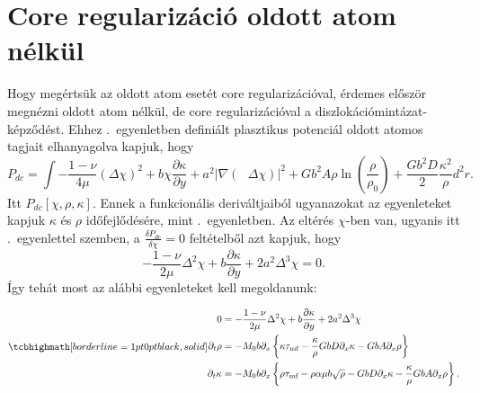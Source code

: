 \documentclass[10pt,a4paper]{scrartcl}
\begin{document}
\section{Core regularizáció oldott atom nélkül}
Hogy megértsük az oldott atom esetét core regularizációval, érdemes először megnézni oldott atom nélkül, de core regularizációval a diszlokációmintázat-képződést. Ehhez .\ egyenletben definiált plasztikus potenciál oldott atomos tagjait elhanyagolva kapjuk, hogy 
\begin{equation} \label{eq:plastic_pot_dc}
{P_{dc}} = \int { - \frac{{1 - \nu }}{{4\mu }}{{\left( {\Delta \chi } \right)}^2} + b\chi \frac{{\partial \kappa }}{{\partial y}} + {a^2}{{\left| {\nabla \left( {{\text{ }}\Delta \chi } \right)} \right|}^2} + G{b^2}A\rho \ln \left( {\frac{\rho }{{{\rho _0}}}} \right) + \frac{{G{b^2}D}}{2}\frac{{{\kappa ^2}}}{\rho }{d^2}r}.
\end{equation}
Itt ${P_{dc}}\left[ {\chi ,\rho ,\kappa } \right]$. Ennek a funkcionális deriváltjaiból ugyanazokat az egyenleteket kapjuk $\kappa$ és $\rho$ időfejlődésére, mint .\ egyenletben. Az eltérés $\chi$-ben van, ugyanis itt .\ egyenlettel szemben, a $\frac{{\delta {P_{dc}}}}{{\delta \chi }} = 0$ feltételből azt kapjuk, hogy 
\[ - \frac{{1 - \nu }}{{2\mu }}{\Delta ^2}\chi  + b\frac{{\partial \kappa }}{{\partial y}} + 2{a^2}{\Delta ^3}\chi  = 0.\]
Így tehát most az alábbi egyenleteket kell megoldanunk:

\begin{gather} \label{eq:eom_dc}
\tcbhighmath[borderline={1pt}{0pt}{black,solid}]{
\begin{aligned}
0 & = - \frac{{1 - \nu }}{{2\mu }}{\Delta ^2}\chi  + b\frac{{\partial \kappa }}{{\partial y}} + 2{a^2}{\Delta ^3}\chi  \\ 
    {\partial _t}\rho  &  =  - {M_0}b{\partial _x}\left\{ {\kappa {\tau _{{\text{mf}}}} - \frac{\kappa }{\rho }GbD{\partial _x}\kappa  - GbA{\partial _x}\rho } \right\} \\ 
  {\partial _t}\kappa  &  =  - {M_0}b{\partial _x}\left\{ {\rho {\tau _{{\text{mf}}}} - \rho \alpha \mu b\sqrt \rho - GbD{\partial _x}\kappa  - \frac{\kappa }{\rho } GbA{\partial _x}\rho } \right\}.\\
\end{aligned}  }
\end{gather}
\end{document}
